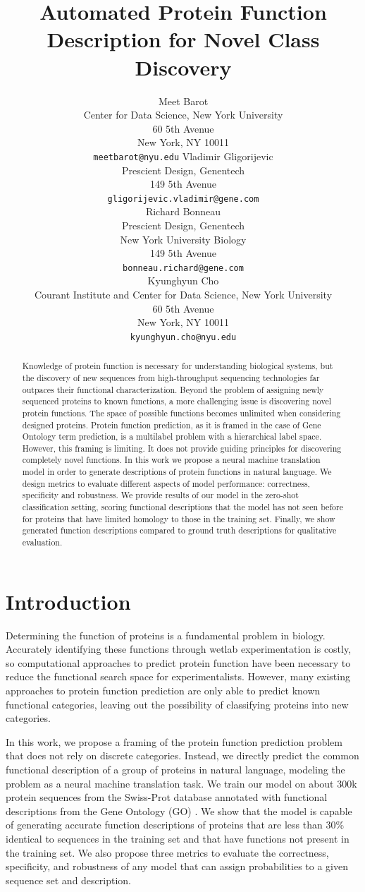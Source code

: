 \documentclass{article}
\title{Automated Protein Function Description for Novel Class Discovery}
\author{Meet Barot \\
        Center for Data Science, New York University\\
		60 5th Avenue\\
        New York, NY 10011\\
        \texttt{meetbarot@nyu.edu}
  \And
  Vladimir Gligorijevic\\
  Prescient Design, Genentech\\
  149 5th Avenue\\
  \texttt{gligorijevic.vladimir@gene.com} \\
  \AND
  Richard Bonneau \\
  Prescient Design, Genentech\\
  New York University Biology \\
  149 5th Avenue\\
  \texttt{bonneau.richard@gene.com} \\
  \And
  Kyunghyun Cho \\
  Courant Institute and Center for Data Science, New York University \\
  60 5th Avenue \\
  New York, NY 10011\\
  \texttt{kyunghyun.cho@nyu.edu} \\
}
\begin{document}
\maketitle

\begin{abstract}
Knowledge of protein function is necessary for understanding biological systems, but the discovery of new sequences from high-throughput sequencing technologies far outpaces their functional characterization.
Beyond the problem of assigning newly sequenced proteins to known functions, a more challenging issue is discovering novel protein functions.
The space of possible functions becomes unlimited when considering designed proteins.
Protein function prediction, as it is framed in the case of Gene Ontology term prediction, is a multilabel problem with a hierarchical label space.
However, this framing is limiting. It does not provide guiding principles for discovering completely novel functions.
In this work we propose a neural machine translation model in order to generate descriptions of protein functions in natural language.
We design metrics to evaluate different aspects of model performance: correctness, specificity and robustness. 
We provide results of our model in the zero-shot classification setting, scoring functional descriptions that the model has not seen before for proteins that have limited homology to those in the training set. 
Finally, we show generated function descriptions compared to ground truth descriptions for qualitative evaluation.
\end{abstract}

\section{Introduction}

    Determining the function of proteins is a fundamental problem in biology.
    Accurately identifying these functions through wetlab experimentation is costly, so computational approaches to predict protein function have been necessary to reduce the functional search space for experimentalists.
    However, many existing approaches to protein function prediction are only able to predict known functional categories, leaving out the possibility of classifying proteins into new categories.

    In this work, we propose a framing of the protein function prediction problem that does not rely on discrete categories. 
    Instead, we directly predict the common functional description of a group of proteins in natural language, modeling the problem as a neural machine translation task. 
    We train our model on about 300k protein sequences from the Swiss-Prot database \citep{SwissProt} annotated with functional descriptions from the Gene Ontology (GO) \citep{GO}.
    We show that the model is capable of generating accurate function descriptions of proteins that are less than 30\% identical to sequences in the training set and that have functions not present in the training set.
    We also propose three metrics to evaluate the correctness, specificity, and robustness of any model that can assign probabilities to a given sequence set and description.
\end{document}

